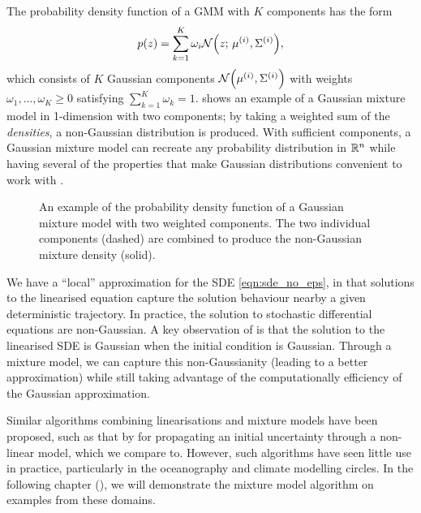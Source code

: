 The probability density function of a GMM with \(K\) components has the form
\[
	p(z) = \sum_{k=1}^{K}{\omega_i \mathcal{N}\!\left(z;\, \mu^{(i)}, \Sigma^{(i)}\right)},
\]
which consists of \(K\) Gaussian components \(\mathcal{N}\!\left(\mu^{(i)}, \Sigma^{(i)}\right)\) with weights \(\omega_1, \dotsc, \omega_K \geq 0\) satisfying \(\sum_{k=1}^{K}\omega_k = 1\).
 shows an example of a Gaussian mixture model in 1-dimension with two components; by taking a weighted sum of the \emph{densities}, a non-Gaussian distribution is produced.
With sufficient components, a Gaussian mixture model can recreate any probability distribution in \(\mathbb{R}^n\) while having several of the properties that make Gaussian distributions convenient to work with \citep{McLachlanEtAl_2019_FiniteMixtureModels}.


\begin{figure}
	\begin{center}
		\caption{An example of the probability density function of a Gaussian mixture model with two weighted components.
		The two individual components (dashed) are combined to produce the non-Gaussian mixture density (solid).}
		\label{fig:mixture_model}
	\end{center}
\end{figure}


We have a ``local'' approximation for the SDE \cref{eqn:sde_no_eps}, in that solutions to the linearised equation capture the solution behaviour nearby a given deterministic trajectory.
In practice, the solution to stochastic differential equations are non-Gaussian.
A key observation of  is that the solution to the linearised SDE is Gaussian when the initial condition is Gaussian.
Through a mixture model, we can capture this non-Gaussianity (leading to a better approximation) while still taking advantage of the computationally efficiency of the Gaussian approximation.

Similar algorithms combining linearisations and mixture models have been proposed, such as that by \citet{DeMarsEtAl_2013_EntropyBasedApproachUncertainty} for propagating an initial uncertainty through a non-linear model, which we compare to.
However, such algorithms have seen little use in practice, particularly in the oceanography and climate modelling circles.
In the following chapter (), we will demonstrate the mixture model algorithm on examples from these domains.


